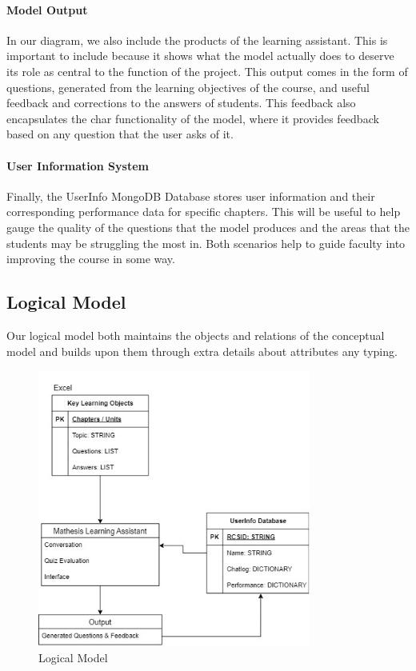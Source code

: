 \documentclass[12pt,a4paper]{article}
\begin{document}
    \paragraph{Model Output}
    In our diagram, we also include the products of the learning assistant.  This is important to include
    because it shows what the model actually does to deserve its role as central to the function of
    the project.  This output comes in the form of questions, generated from the learning objectives
    of the course, and useful feedback and corrections to the answers of students.  This feedback also
    encapsulates the char functionality of the model, where it provides feedback based on any question
    that the user asks of it.

    \paragraph{User Information System}
    Finally, the UserInfo MongoDB Database stores user information and their corresponding performance
    data for specific chapters.  This will be useful to help gauge the quality of the questions that
    the model produces and the areas that the students may be struggling the most in.  Both scenarios
    help to guide faculty into improving the course in some way.

    
    \subsection{Logical Model}
    
    Our logical model both maintains the objects and relations of the conceptual model and builds upon
    them through extra details about attributes any typing.

    \begin{figure}[h]
        \centering
        \includegraphics[width=0.8\textwidth]{Logical_diagram}
        \caption{Logical Model}
        \label{fig:logicalModel}
    \end{figure}
\end{document}
